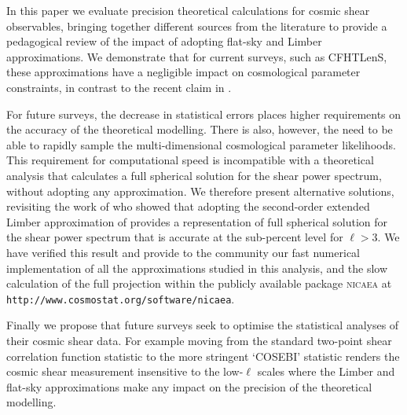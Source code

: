 In this paper we evaluate precision theoretical calculations for cosmic shear observables, bringing together different sources from the literature to provide a pedagogical review of the impact of adopting flat-sky and Limber approximations.  We demonstrate that for current surveys, such as CFHTLenS, these approximations have a negligible impact on cosmological parameter constraints, in contrast to the recent claim in \citet{2016arXiv161104954K}.  

For future surveys, the decrease in statistical errors places higher requirements on the accuracy of the theoretical modelling.    There is also, however, the need to be able to rapidly sample the multi-dimensional cosmological parameter likelihoods.  This requirement for computational speed is incompatible with a theoretical analysis that calculates a full spherical solution for the shear power spectrum, without adopting any approximation.  We therefore present alternative solutions, revisiting the work of  \citet{2012PhRvD..86b3001B} who showed that adopting the second-order extended Limber approximation of \citet{2008PhRvD..78l3506L} provides a representation of full spherical solution for the shear power spectrum that is accurate at the sub-percent level for $\ell > 3$.    We have verified this result and provide to the community our fast numerical implementation of all the approximations studied in this analysis,
and the slow calculation of the full projection within the publicly available package \textsc{nicaea} at \texttt{http://www.cosmostat.org/software/nicaea}.

Finally we propose that future surveys seek to optimise the statistical analyses of their cosmic shear data.  For example moving from the standard two-point shear correlation function statistic to the more stringent `COSEBI' statistic \citep{schneider/etal:2010} renders the cosmic shear measurement insensitive to the low-$\ell$ scales where the Limber and flat-sky approximations make any impact on the precision of the theoretical modelling.  
